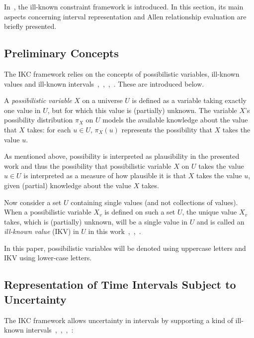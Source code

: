 In~\cite{Pons2011}, the ill-known constraint framework is introduced. In this section, its main aspects concerning interval representation and Allen relationship evaluation are briefly presented.

\subsection{\label{subsec:ikc-preliminaries}Preliminary Concepts}
The IKC framework relies on the concepts of possibilistic variables, ill-known values and ill-known intervals~\cite{JoseEnriquePons2012},~\cite{Billiet2012},~\cite{Dubois1983},~\cite{Pons2011}. These are introduced below.

\begin{definition}
\label{def:poss-variable}
A \emph{possibilistic variable} $X$ on a universe $U$ is defined as a variable taking exactly one value in $U$, but for which this value is (partially) unknown. The variable $X$'s possibility distribution $\pi_X$ on $U$ models the available knowledge about the value that $X$ takes: for each $u \in U$, $\pi_X(u)$ represents the possibility that $X$ takes the value $u$.
\end{definition}

As mentioned above, possibility is interpreted as plausibility in the presented work and thus the possibility that possibilistic variable $X$ on $U$ takes the value $u \in U$ is interpreted as a measure of how plausible it is that $X$ takes the value $u$, given (partial) knowledge about the value $X$ takes.

Now consider a set $U$ containing single values (and not collections of values). When a possibilistic variable $X_{v}$ is defined on such a set $U$, the unique value $X_{v}$ takes, which is (partially) unknown, will be a single value in $U$ and is called an \emph{ill-known value} (IKV) in $U$ in this work~\cite{Billiet2012},~\cite{Pons2011},~\cite{Dubois1988}.

In this paper, possibilistic variables will be denoted using uppercase letters and IKV using lower-case letters.

\subsection{\label{subsec:ikc-interval}Representation of Time Intervals Subject to Uncertainty}
The IKC framework allows uncertainty in intervals by supporting a kind of ill-known intervals~\cite{JoseEnriquePons2012},~\cite{Billiet2012},~\cite{Dubois1983},~\cite{Pons2011}:

